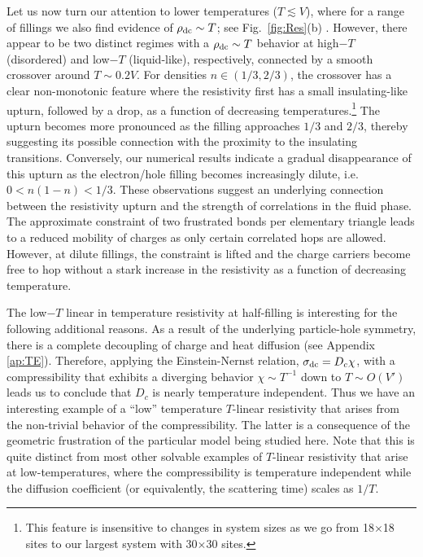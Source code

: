 \documentclass[aps,prx,onecolumn,amsmath,nofootinbib,amssymb,11pt]{revtex4-1}
\def \tn {\textnormal}
\def \rd {\rho_{\tn{dc}}}
\begin{document}
{Let us now turn our attention to lower temperatures ($T\lesssim V$), where for a range of fillings we also find evidence of $\rd\sim T$; see Fig.~\ref{fig:Res}(b) . However, there appear to be two distinct regimes with a $\rd\sim T$ behavior at high$-T$ (disordered) and low$-T$ (liquid-like), respectively, connected by a smooth crossover around $T\sim0.2V$. For densities $n\in(1/3,2/3)$, the crossover has a clear non-monotonic feature where the resistivity first has a small insulating-like upturn, followed by a drop, as a function of decreasing temperatures.\footnote{\textsf{This feature is insensitive to changes in system sizes as we go from  18$\times$18 sites to our largest system with 30$\times$30 sites.}} The upturn becomes more pronounced as the filling approaches $1/3$ and $2/3$, thereby suggesting its possible connection with the proximity to the insulating transitions. Conversely, our numerical results indicate a gradual disappearance of this upturn as the electron/hole filling becomes increasingly dilute, i.e. $0<n(1-n)<1/3$. These observations suggest an underlying connection between the resistivity upturn and the strength of correlations in the fluid phase. The approximate constraint of two frustrated bonds per elementary triangle leads to a reduced mobility of charges as only certain correlated hops are allowed. However, at dilute fillings, the constraint is lifted and the charge carriers become free to hop without a stark increase in the resistivity as a function of decreasing temperature.

The low$-T$ linear in temperature resistivity at half-filling is interesting for the following additional reasons. As a result of the underlying  particle-hole symmetry, there is a complete decoupling of charge and heat diffusion (see Appendix \ref{ap:TE}). Therefore, applying the Einstein-Nernst relation, $\sigma_{\tn{dc}}=D_c\chi$, with a compressibility that exhibits a diverging behavior $\chi \sim T^{-1}$ down to $T\sim O(V')$ leads us to conclude that $D_c$ is nearly temperature independent. Thus we have an interesting example of a ``low'' temperature $T$-linear resistivity that arises from the non-trivial behavior of the compressibility. The latter is a consequence of the geometric frustration of the particular model being studied here. Note that this is quite distinct from most other solvable examples of $T$-linear resistivity that arise at low-temperatures, where the compressibility is temperature independent while the diffusion coefficient (or equivalently, the scattering time) scales as $1/T$.


}
\end{document}

